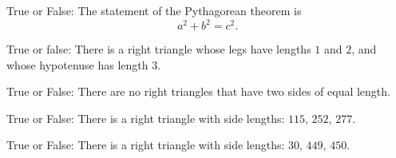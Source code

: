 \documentclass[nooutcomes,noauthor]{ximera}
\author{Bart Snapp}
\begin{document}
\maketitle





\begin{exercise}  
  True or False:
  The statement of the Pythagorean theorem is
  \[
  a^2 + b^2 = c^2.
  \]
\end{exercise}

\begin{exercise}True or false:
 There is a right triangle whose legs have lengths $1$ and $2$, and whose hypotenuse has length $3$.
\end{exercise}





\begin{exercise}
  True or False:
  There are no right triangles that have two sides of equal length.
\end{exercise}

\begin{exercise}
  True or False:
  There is a right triangle with side lengths: $115$, $252$, $277$.
\end{exercise}



\begin{exercise}
  True or False:
  There is a right triangle with side lengths: $30$, $449$, $450$.
\end{exercise}




\end{document}
